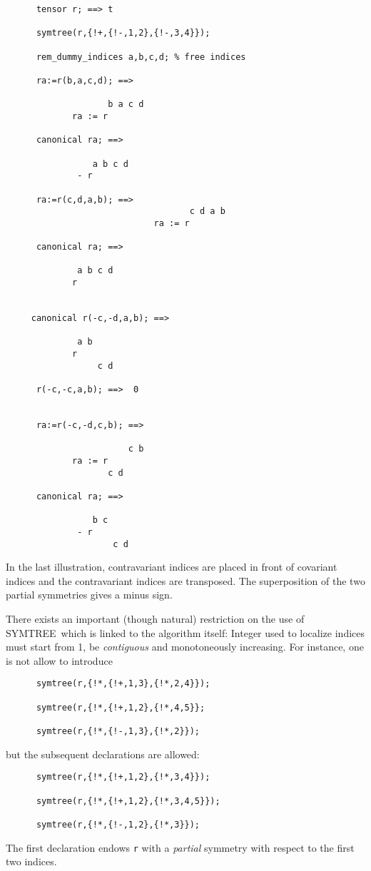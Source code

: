 \begin{verbatim}
      tensor r; ==> t

      symtree(r,{!+,{!-,1,2},{!-,3,4}});

      rem_dummy_indices a,b,c,d; % free indices

      ra:=r(b,a,c,d); ==>

                    b a c d
             ra := r

      canonical ra; ==>

                 a b c d
              - r

      ra:=r(c,d,a,b); ==>
                                    c d a b
                             ra := r

      canonical ra; ==>

              a b c d
             r


     canonical r(-c,-d,a,b); ==>

              a b
             r
                  c d

      r(-c,-c,a,b); ==>  0


      ra:=r(-c,-d,c,b); ==>

                        c b
             ra := r
                    c d

      canonical ra; ==>

                 b c
              - r
                     c d
\end{verbatim}
In the last illustration, contravariant indices are placed in front
of covariant indices and the contravariant indices are transposed.
The superposition of the two partial symmetries gives a minus sign.

There exists an important (though natural) restriction on the use of
SYMTREE\ which is linked to the algorithm itself: Integer used to localize
indices must start from 1, be \emph{contiguous} and monotoneously increasing.
For instance, one is not allow to introduce
\begin{verbatim}
      symtree(r,{!*,{!+,1,3},{!*,2,4}});

      symtree(r,{!*,{!+,1,2},{!*,4,5}};

      symtree(r,{!*,{!-,1,3},{!*,2}});
\end{verbatim}
but the subsequent declarations are allowed:
\begin{verbatim}
      symtree(r,{!*,{!+,1,2},{!*,3,4}});

      symtree(r,{!*,{!+,1,2},{!*,3,4,5}});

      symtree(r,{!*,{!-,1,2},{!*,3}});
\end{verbatim}
The first declaration endows \texttt{r} with a \emph{partial} symmetry
with respect to the first two indices.


